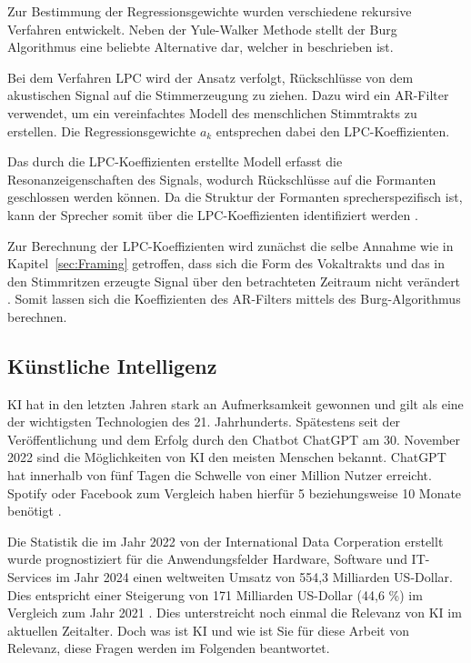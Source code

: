 Zur Bestimmung der Regressionsgewichte wurden verschiedene rekursive Verfahren entwickelt.
Neben der Yule-Walker Methode stellt der Burg Algorithmus eine beliebte Alternative dar, welcher in \citeauthor[][S. 443]{marple_new_1980} beschrieben ist.

Bei dem Verfahren \ac{LPC} wird der Ansatz verfolgt, Rückschlüsse von dem akustischen Signal auf die Stimmerzeugung zu ziehen.
Dazu wird ein \ac{AR}-Filter verwendet, um ein vereinfachtes Modell des menschlichen Stimmtrakts zu erstellen.
Die Regressionsgewichte $a_k$ entsprechen dabei den \ac{LPC}-Koeffizienten.

Das durch die \ac{LPC}-Koeffizienten erstellte Modell erfasst die Resonanzeigenschaften des Signals, wodurch Rückschlüsse auf die Formanten geschlossen werden können.
Da die Struktur der Formanten sprecherspezifisch ist, kann der Sprecher somit über die \ac{LPC}-Koeffizienten identifiziert werden \autocite[vgl.][S. 117]{sidorov_text-independent_2010}.

Zur Berechnung der \ac{LPC}-Koeffizienten wird zunächst die selbe Annahme wie in Kapitel~\ref{sec:Framing} getroffen, dass sich die Form des Vokaltrakts und das in den Stimmritzen erzeugte Signal über den betrachteten Zeitraum nicht verändert \autocite[vgl.][S. 1304]{atal_effectiveness_1974}.
Somit lassen sich die Koeffizienten des \ac{AR}-Filters mittels des Burg-Algorithmus berechnen.

\subsection{Künstliche Intelligenz}
\ac{KI} hat in den letzten Jahren stark an Aufmerksamkeit gewonnen und gilt als eine der wichtigsten Technologien des 21. Jahrhunderts.
Spätestens seit der Veröffentlichung und dem Erfolg durch den Chatbot ChatGPT am 30. November 2022 sind die Möglichkeiten von \ac{KI} den meisten Menschen bekannt. 
ChatGPT hat innerhalb von fünf Tagen die Schwelle von einer Million Nutzer erreicht. 
Spotify oder Facebook zum Vergleich haben hierfür 5 beziehungsweise 10 Monate benötigt \autocite[vgl. ][]{janson_infografik_2023}.

Die Statistik die im Jahr 2022 von der International Data Corperation erstellt wurde prognostiziert für die Anwendungsfelder Hardware, Software und IT-Services im Jahr 2024 einen weltweiten Umsatz von 554,3 Milliarden US-Dollar.
Dies entspricht einer Steigerung von 171 Milliarden US-Dollar (44,6 \%) im Vergleich zum Jahr 2021 \autocite[vgl. ][]{idc_kunstliche_2022}.
Dies unterstreicht noch einmal die Relevanz von \ac{KI} im aktuellen Zeitalter.
Doch was ist \ac{KI} und wie ist Sie für diese Arbeit von Relevanz, diese Fragen werden im Folgenden beantwortet.

